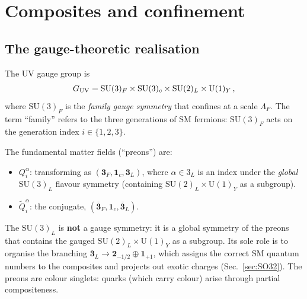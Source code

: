 \documentclass[12pt,a4paper]{article}
\newcommand{\SU}{\mathrm{SU}}
\newcommand{\UU}{\mathrm{U}}
\begin{document}
\section{Composites and confinement}
\label{sec:composites}

\subsection{The gauge-theoretic realisation}

The UV gauge group is
\begin{equation}
  G_{\rm UV} = \SU(3)_F \times \SU(3)_c \times \SU(2)_L
  \times \UU(1)_Y\,,
  \label{eq:GUV}
\end{equation}
where $\SU(3)_F$ is the \emph{family gauge symmetry} that
confines at a scale $\Lambda_F$.
The term ``family'' refers to the three generations of SM
fermions: $\SU(3)_F$ acts on the generation index
$i \in \{1, 2, 3\}$.

The fundamental matter fields (``preons'') are:
\begin{itemize}
  \item $Q^\alpha_i$: transforming as
    $(\mathbf{3}_F, \mathbf{1}_c, \mathbf{3}_L)$,
    where $\alpha \in 3_L$ is an index under the
    \emph{global} $\SU(3)_L$ flavour symmetry
    (containing $\SU(2)_L \times \UU(1)_Y$ as a subgroup).
  \item $\tilde{Q}_i^\alpha$: the conjugate,
    $(\overline{\mathbf{3}}_F, \mathbf{1}_c,
    \overline{\mathbf{3}}_L)$.
\end{itemize}
The $\SU(3)_L$ is \textbf{not} a gauge symmetry: it is a global
symmetry of the preons that contains the gauged
$\SU(2)_L \times \UU(1)_Y$ as a subgroup.
Its sole role is to organise the branching
$\mathbf{3}_L \to \mathbf{2}_{-1/2} \oplus \mathbf{1}_{+1}$,
which assigns the correct SM quantum numbers to the composites
and projects out exotic charges (Sec.~\ref{sec:SO32}).
The preons are colour singlets: quarks (which carry colour) arise
through partial compositeness.
\end{document}
